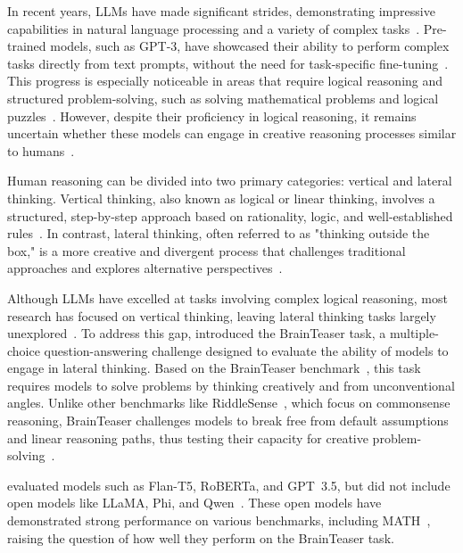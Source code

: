 In recent years, \acp{LLM} have made significant strides, demonstrating impressive capabilities in natural language processing and a variety of complex tasks~\cite{naveedComprehensiveOverviewLarge2024}. Pre-trained models, such as GPT-3, have showcased their ability to perform complex tasks directly from text prompts, without the need for task-specific fine-tuning~\cite{brownLanguageModelsAre2020}. This progress is especially noticeable in areas that require logical reasoning and structured problem-solving, such as solving mathematical problems and logical puzzles~\cite{panLogicLMEmpoweringLarge2023,zebazeTreeProblemsImproving2024,yuFlowReasoningTraining2025}. However, despite their proficiency in logical reasoning, it remains uncertain whether these models can engage in creative reasoning processes similar to humans~\cite{jiangBRAINTEASERLateralThinking2023}.

Human reasoning can be divided into two primary categories: vertical and lateral thinking. Vertical thinking, also known as logical or linear thinking, involves a structured, step-by-step approach based on rationality, logic, and well-established rules~\cite{jiangBRAINTEASERLateralThinking2023}. In contrast, lateral thinking, often referred to as "thinking outside the box," is a more creative and divergent process that challenges traditional approaches and explores alternative perspectives~\cite{jiangBRAINTEASERLateralThinking2023}.

Although \acp{LLM} have excelled at tasks involving complex logical reasoning, most research has focused on vertical thinking, leaving lateral thinking tasks largely unexplored~\cite{jiangBRAINTEASERLateralThinking2023,chenWeakevalStrongEvaluatingEliciting2024,huangLatEvalInteractiveLLMs2024}. To address this gap, \textcite{jiangBRAINTEASERLateralThinking2023} introduced the BrainTeaser task, a multiple-choice question-answering challenge designed to evaluate the ability of models to engage in lateral thinking. Based on the BrainTeaser benchmark~\cite{jiangBRAINTEASERLateralThinking2023}, this task requires models to solve problems by thinking creatively and from unconventional angles. Unlike other benchmarks like RiddleSense~\cite{linRiddleSenseReasoningRiddle2021}, which focus on commonsense reasoning, BrainTeaser challenges models to break free from default assumptions and linear reasoning paths, thus testing their capacity for creative problem-solving~\cite{jiangBRAINTEASERLateralThinking2023}.

\textcite{jiangBRAINTEASERLateralThinking2023} evaluated models such as Flan-T5, RoBERTa, and \acs{GPT}~3.5, but did not include open models like \acs{LLaMA}, \acs{Phi}, and \acs{Qwen}~\cite{jiangBRAINTEASERLateralThinking2023}. These open models have demonstrated strong performance on various benchmarks, including \ac{MATH}~\cite{OpenLLMLeaderboard}, raising the question of how well they perform on the BrainTeaser task.

